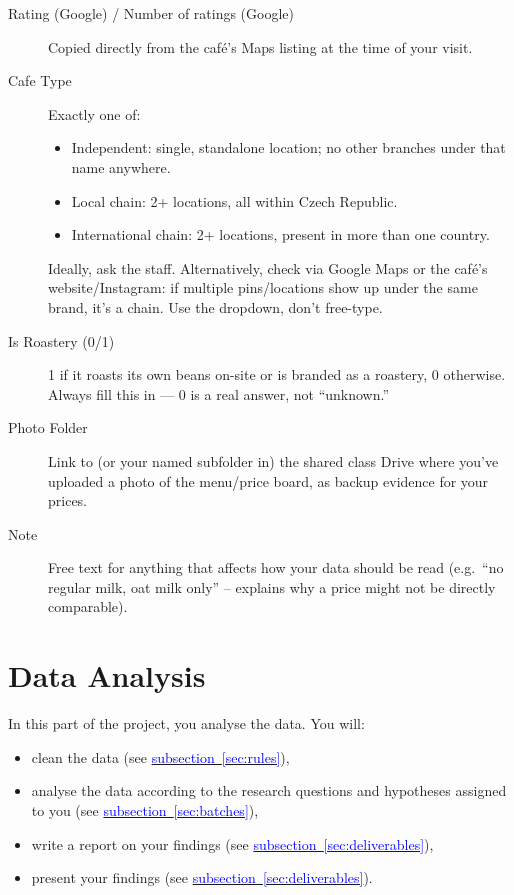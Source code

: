\documentclass[11pt,a4paper]{article}
\begin{document}
\begin{description}
\item[Rating (Google) / Number of ratings (Google)] Copied directly from the caf\'e's Maps listing at the time of your visit.
\item[Cafe Type] Exactly one of:
  \begin{itemize}
  \item Independent: single, standalone location; no other branches under that name anywhere.
  \item Local chain: 2+ locations, all within Czech Republic.
  \item International chain: 2+ locations, present in more than one country.
  \end{itemize}
  Ideally, ask the staff. Alternatively, check via Google Maps or the caf\'e's website/Instagram: if multiple pins/locations show up under the same brand, it's a chain. Use the dropdown, don't free-type.
\item[Is Roastery (0/1)] 1 if it roasts its own beans on-site or is branded as a roastery, 0 otherwise. Always fill this in --- 0 is a real answer, not ``unknown.''
\item[Photo Folder] Link to (or your named subfolder in) the shared class Drive where you've uploaded a photo of the menu/price board, as backup evidence for your prices.
\item[Note] Free text for anything that affects how your data should be read (e.g.\ ``no regular milk, oat milk only'' -- explains why a price might not be directly comparable).
\end{description}

\clearpage
\section{Data Analysis}\label{sec:analysis}

In this part of the project, you analyse the data. You will:

\begin{itemize}
	\item clean the data (see \hyperref[sec:rules]{\textcolor{blue}{subsection~\ref*{sec:rules}}}),
	\item analyse the data according to the research questions and hypotheses assigned to you (see \hyperref[sec:batches]{\textcolor{blue}{subsection~\ref*{sec:batches}}}),
	\item write a report on your findings (see \hyperref[sec:deliverables]{\textcolor{blue}{subsection~\ref*{sec:deliverables}}}),
	\item present your findings (see \hyperref[sec:deliverables]{\textcolor{blue}{subsection~\ref*{sec:deliverables}}}).
\end{itemize}
\end{document}
